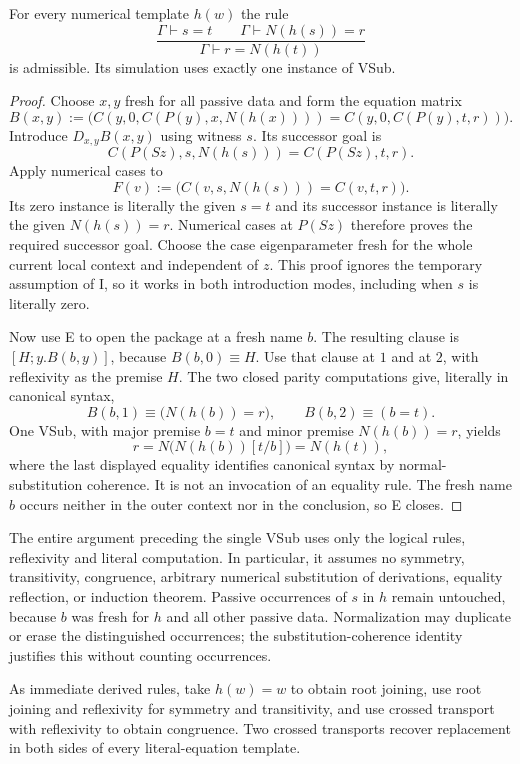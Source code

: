 \begin{theorem}
For every numerical template $h(w)$ the rule
\[
 \frac{\Gamma\vdash s=t\qquad\Gamma\vdash N(h(s))=r}
      {\Gamma\vdash r=N(h(t))}
\]
is admissible. Its simulation uses exactly one instance of VSub.
\end{theorem}
\begin{proof}
Choose $x,y$ fresh for all passive data and form the equation matrix
\[
 B(x,y):=\bigl(
 C(y,0,C(P(y),x,N(h(x))))
 =C(y,0,C(P(y),t,r))\bigr).
\]
Introduce $D_{x,y}B(x,y)$ using witness $s$. Its successor goal is
\[
 C(P(Sz),s,N(h(s)))=C(P(Sz),t,r).
\]
Apply numerical cases to
\[
 F(v):=\bigl(C(v,s,N(h(s)))=C(v,t,r)\bigr).
\]
Its zero instance is literally the given $s=t$ and its successor
instance is literally the given $N(h(s))=r$. Numerical cases at
$P(Sz)$ therefore proves the required successor goal. Choose the
case eigenparameter fresh for the whole current local context and
independent of $z$. This proof ignores the temporary assumption
of I, so it works in both introduction modes, including when $s$
is literally zero.

Now use E to open the package at a fresh name $b$. The resulting
clause is $[H;y.B(b,y)]$, because $B(b,0)\equiv H$. Use that clause
at $1$ and at $2$, with reflexivity as the premise $H$. The two
closed parity computations give, literally in canonical syntax,
\[
 B(b,1)\equiv\bigl(N(h(b))=r\bigr),\qquad
 B(b,2)\equiv(b=t).
\]
One VSub, with major premise $b=t$ and minor premise $N(h(b))=r$,
yields
\[
 r=N\bigl(N(h(b))[t/b]\bigr)=N(h(t)),
\]
where the last displayed equality identifies canonical syntax by
normal-substitution coherence. It is not an invocation of an equality
rule. The fresh name $b$ occurs neither in the outer context nor in
the conclusion, so E closes.
\end{proof}

The entire argument preceding the single VSub uses only the logical
rules, reflexivity and literal computation. In particular, it assumes
no symmetry, transitivity, congruence, arbitrary numerical substitution
of derivations, equality reflection, or induction theorem. Passive
occurrences of $s$ in $h$ remain untouched, because $b$ was fresh for
$h$ and all other passive data. Normalization may duplicate or erase
the distinguished occurrences; the substitution-coherence identity
justifies this without counting occurrences.

As immediate derived rules, take $h(w)=w$ to obtain root joining,
use root joining and reflexivity for symmetry and transitivity, and
use crossed transport with reflexivity to obtain congruence. Two
crossed transports recover replacement in both sides of every
literal-equation template.


